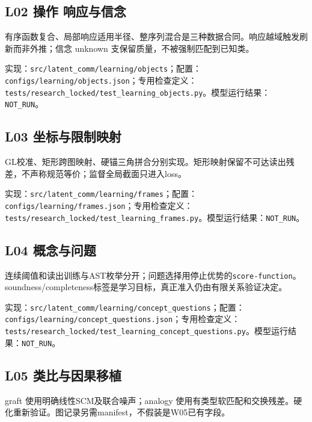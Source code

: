\documentclass[
  10pt,
]{article}
\begin{document}
\subsection{L02 操作
响应与信念}\label{l02-ux64cdux4f5c-ux54cdux5e94ux4e0eux4fe1ux5ff5}

有序函数复合、局部响应适用半径、整序列混合是三种数据合同。响应越域触发刷新而非外推；信念
unknown 支保留质量，不被强制匹配到已知类。

实现：{\small\nolinkurl{src/latent_comm/learning/objects}}；配置：{\small\nolinkurl{configs/learning/objects.json}}；专用检查定义：{\small\nolinkurl{tests/research_locked/test_learning_objects.py}}。模型运行结果：\nolinkurl{NOT_RUN}。

\subsection{L03
坐标与限制映射}\label{l03-ux5750ux6807ux4e0eux9650ux5236ux6620ux5c04}

GL校准、矩形跨图映射、硬锚三角拼合分别实现。矩形映射保留不可达读出残差，不声称规范等价；监督全局截面只进入loss。

实现：{\small\nolinkurl{src/latent_comm/learning/frames}}；配置：{\small\nolinkurl{configs/learning/frames.json}}；专用检查定义：{\small\nolinkurl{tests/research_locked/test_learning_frames.py}}。模型运行结果：\nolinkurl{NOT_RUN}。

\subsection{L04 概念与问题}\label{l04-ux6982ux5ff5ux4e0eux95eeux9898}

连续阈值和读出训练与AST枚举分开；问题选择用停止优势的\nolinkurl{score-function}。soundness/completeness标签是学习目标，真正准入仍由有限关系验证决定。

实现：{\small\nolinkurl{src/latent_comm/learning/concept_questions}}；配置：{\small\nolinkurl{configs/learning/concept_questions.json}}；专用检查定义：{\small\nolinkurl{tests/research_locked/test_learning_concept_questions.py}}。模型运行结果：\nolinkurl{NOT_RUN}。

\subsection{L05
类比与因果移植}\label{l05-ux7c7bux6bd4ux4e0eux56e0ux679cux79fbux690d}

graft 使用明确线性SCM及联合噪声；analogy
使用有类型软匹配和交换残差。硬化重新验证。图记录另需manifest，不假装是W05已有字段。
\end{document}
